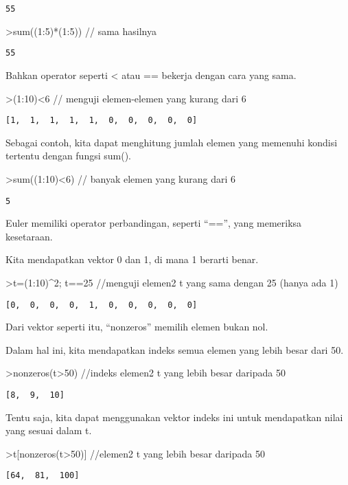 \documentclass[
]{book}
\begin{document}
\begin{verbatim}
55
\end{verbatim}

\textgreater sum((1:5)*(1:5)) // sama hasilnya

\begin{verbatim}
55
\end{verbatim}

Bahkan operator seperti \textless{} atau == bekerja dengan cara yang sama.

\textgreater(1:10)\textless6 // menguji elemen-elemen yang kurang dari 6

\begin{verbatim}
[1,  1,  1,  1,  1,  0,  0,  0,  0,  0]
\end{verbatim}

Sebagai contoh, kita dapat menghitung jumlah elemen yang memenuhi kondisi tertentu dengan fungsi sum().

\textgreater sum((1:10)\textless6) // banyak elemen yang kurang dari 6

\begin{verbatim}
5
\end{verbatim}

Euler memiliki operator perbandingan, seperti ``=='', yang memeriksa kesetaraan.

Kita mendapatkan vektor 0 dan 1, di mana 1 berarti benar.

\textgreater t=(1:10)\^{}2; t==25 //menguji elemen2 t yang sama dengan 25 (hanya ada 1)

\begin{verbatim}
[0,  0,  0,  0,  1,  0,  0,  0,  0,  0]
\end{verbatim}

Dari vektor seperti itu, ``nonzeros'' memilih elemen bukan nol.

Dalam hal ini, kita mendapatkan indeks semua elemen yang lebih besar dari 50.

\textgreater nonzeros(t\textgreater50) //indeks elemen2 t yang lebih besar daripada 50

\begin{verbatim}
[8,  9,  10]
\end{verbatim}

Tentu saja, kita dapat menggunakan vektor indeks ini untuk mendapatkan nilai yang sesuai dalam t.

\textgreater t{[}nonzeros(t\textgreater50){]} //elemen2 t yang lebih besar daripada 50

\begin{verbatim}
[64,  81,  100]
\end{verbatim}
\end{document}
